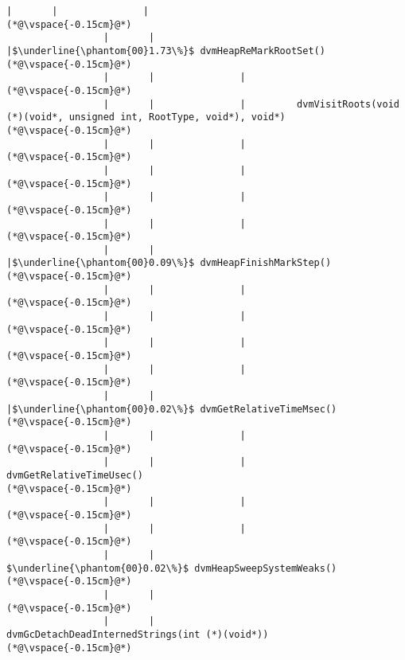 \begin{lstlisting}[caption=NewDirectByteBuffer, label=profile:C2JNewDirectBuffer-512, numberbychapter=true, frame=lines, float, floatplacement=t]
                 |       |               |
(*@\vspace{-0.15cm}@*)
                 |       |               |$\underline{\phantom{00}1.73\%}$ dvmHeapReMarkRootSet()
(*@\vspace{-0.15cm}@*)
                 |       |               |
(*@\vspace{-0.15cm}@*)
                 |       |               |         dvmVisitRoots(void (*)(void*, unsigned int, RootType, void*), void*)
(*@\vspace{-0.15cm}@*)
                 |       |               |        
(*@\vspace{-0.15cm}@*)
                 |       |               |        
(*@\vspace{-0.15cm}@*)
                 |       |               |
(*@\vspace{-0.15cm}@*)
                 |       |               |
(*@\vspace{-0.15cm}@*)
                 |       |               |$\underline{\phantom{00}0.09\%}$ dvmHeapFinishMarkStep()
(*@\vspace{-0.15cm}@*)
                 |       |               |        
(*@\vspace{-0.15cm}@*)
                 |       |               |        
(*@\vspace{-0.15cm}@*)
                 |       |               |
(*@\vspace{-0.15cm}@*)
                 |       |               |
(*@\vspace{-0.15cm}@*)
                 |       |               |$\underline{\phantom{00}0.02\%}$ dvmGetRelativeTimeMsec()
(*@\vspace{-0.15cm}@*)
                 |       |               |
(*@\vspace{-0.15cm}@*)
                 |       |               |       dvmGetRelativeTimeUsec()
(*@\vspace{-0.15cm}@*)
                 |       |               |
(*@\vspace{-0.15cm}@*)
                 |       |               |
(*@\vspace{-0.15cm}@*)
                 |       |                $\underline{\phantom{00}0.02\%}$ dvmHeapSweepSystemWeaks()
(*@\vspace{-0.15cm}@*)
                 |       |
(*@\vspace{-0.15cm}@*)
                 |       |                       dvmGcDetachDeadInternedStrings(int (*)(void*))
(*@\vspace{-0.15cm}@*)

\end{lstlisting}
